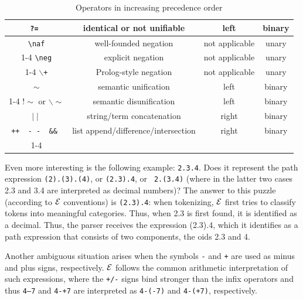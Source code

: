 \documentclass[11pt]{article}
\newcommand{\ERGO}{\mbox{\ensuremath{\cal{E}}\smaller{{\sc{RGO}}}}\xspace}
\newcommand{\FLSYSTEM}{\ERGO}
\newcommand{\bs}{\textbackslash}
\newcommand{\RULELOGNAF}{{\texttt{{\bs}naf}}\xspace}
\newcommand{\RULELOGNEG}{{\texttt{{\bs}neg}}\xspace}
\begin{document}
\begin{table}[htb]
{\begin{tabular}{|c|c|c|c|}
\tt ?= & identical or not unifiable & left & binary \\ \hline
 \RULELOGNAF & well-founded negation & not applicable & unary \\ \cline{1-4}
 \RULELOGNEG & explicit negation & not applicable & unary \\ \cline{1-4}
 \texttt{$\backslash$+} & Prolog-style negation & not applicable & unary \\ \hline
 \texttt{$\sim$} & semantic unification & left & binary \\ \cline{1-4}
 \texttt{$!\sim$} or \texttt{$\backslash\sim$} & semantic disunification & left & binary \\ \hline
 \texttt{$\mid\mid$} & string/term concatenation & right & binary \\ \hline
\tt ++~ -\,-~ \&\& & list append/difference/intersection & right & binary \\ \cline{1-4}
\hline
\end{tabular}
}
\caption{Operators in increasing precedence order}
\label{tab:tab-op-pre}
\end{table}

Even more interesting is the following example: {\tt 2.3.4}. Does it
represent the path expression {\tt (2).(3).(4)}, or {\tt (2.3).4}, or {\tt
  2.(3.4)} (where in the latter two cases 2.3 and 3.4 are interpreted as
decimal numbers)? The answer to this puzzle (according to \FLSYSTEM conventions)
is {\tt (2.3).4}: when
tokenizing, \FLSYSTEM first tries to classify tokens into meaningful
categories. Thus, when 2.3 is first found, it is identified as a
decimal. Thus, the parser receives the expression (2.3).4, which it
identifies as a path expression that consists of two components, the oids
2.3 and 4.

Another ambiguous situation arises when the symbols {\tt -} and {\tt +} are
used as minus and plus
signs, respectively. \FLSYSTEM follows the common arithmetic interpretation of
such expressions, where the {\tt +/-} signs bind stronger than the infix
operators and thus
{\tt 4--7} and {\tt 4-+7} are interpreted as {\tt 4-(-7)} and {\tt 4-(+7)},
respectively.
\end{document}
